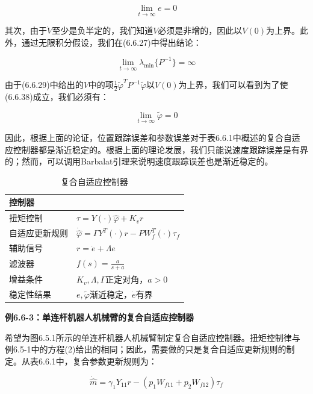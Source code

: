 \documentclass[12pt,a4paper]{ctexart}
\begin{document}
\begin{equation}\label{eq:e-converge-composite}
\lim_{t \to \infty} e = 0
\end{equation}

其次，由于$\dot{V}$至少是负半定的，我们知道$V$必须是非增的，因此以$V(0)$为上界。此外，通过无限积分假设，我们在(6.6.27)中得出结论：

\begin{equation}\label{eq:P-bound}
\lim_{t \to \infty} \lambda_{\min}\{P^{-1}\} = \infty
\end{equation}

由于(6.6.29)中给出的$V$中的项$\frac{1}{2}\tilde{\varphi}^T P^{-1} \tilde{\varphi}$以$V(0)$为上界，我们可以看到为了使(6.6.38)成立，我们必须有：

\begin{equation}\label{eq:param-zero}
\lim_{t \to \infty} \tilde{\varphi} = 0
\end{equation}

因此，根据上面的论证，位置跟踪误差和参数误差对于表6.6.1中概述的复合自适应控制器都是渐近稳定的。根据上面的理论发展，我们只能说速度跟踪误差是有界的；然而，可以调用Barbalat引理来说明速度跟踪误差也是渐近稳定的。

\begin{table}[H]
\centering
\caption{复合自适应控制器}
\begin{tabular}{|l|l|}
\hline
\textbf{控制器} & \\ \hline
扭矩控制 & $\tau = Y(\cdot)\hat{\varphi} + K_v r$ \\ \hline
自适应更新规则 & $\dot{\hat{\varphi}} = \Gamma Y^T(\cdot)r - P W_f^T(\cdot)\tau_f$ \\ \hline
辅助信号 & $r = \dot{e} + \Lambda e$ \\ \hline
滤波器 & $f(s) = \frac{a}{s + a}$ \\ \hline
增益条件 & $K_v, \Lambda, \Gamma$正定对角，$a > 0$ \\ \hline
稳定性结果 & $e, \tilde{\varphi}$渐近稳定，$\dot{e}$有界 \\ \hline
\end{tabular}
\end{table}

\textbf{例6.6-3：单连杆机器人机械臂的复合自适应控制器}

希望为图6.5.1所示的单连杆机器人机械臂制定复合自适应控制器。扭矩控制律与例6.5-1中的方程(2)给出的相同；因此，需要做的只是复合自适应更新规则的制定。从表6.6.1中，复合参数更新规则为：

\begin{equation}
\dot{\hat{m}} = \gamma_1 Y_{11} r - (p_1 W_{f11} + p_2 W_{f12})\tau_f
\end{equation}
\end{document}
